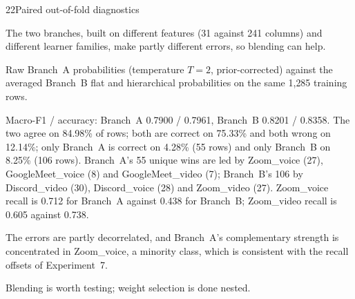  
\begin{explog}{22}{Paired out-of-fold diagnostics}
\item[Hypothesis] The two branches, built on different features (31 against 241 columns) and
different learner families, make partly different errors, so blending can help.
\item[Method] Raw Branch~A probabilities (temperature $T=2$, prior-corrected) against the
averaged Branch~B flat and hierarchical probabilities on the same 1{,}285 training
rows.
\item[Result] Macro-F1 / accuracy: Branch~A 0.7900 / 0.7961, Branch~B 0.8201 / 0.8358. The
two agree on 84.98\% of rows; both are correct on 75.33\% and both wrong on 12.14\%;
only Branch~A is correct on 4.28\% (55 rows) and only Branch~B on 8.25\% (106
rows). Branch~A's 55 unique wins are led by Zoom\_voice (27), GoogleMeet\_voice (8)
and GoogleMeet\_video (7); Branch~B's 106 by Discord\_video (30), Discord\_voice (28)
and Zoom\_video (27). Zoom\_voice recall is 0.712 for Branch~A against 0.438 for
Branch~B; Zoom\_video recall is 0.605 against 0.738.
\item[Inference] The errors are partly decorrelated, and Branch~A's complementary strength is
concentrated in Zoom\_voice, a minority class, which is consistent with the recall
offsets of Experiment~7.
\item[Verdict] Blending is worth testing; weight selection is done nested.
\end{explog}

